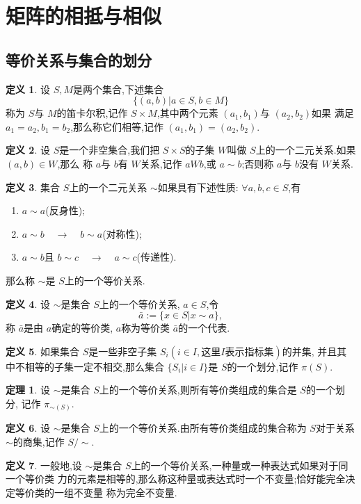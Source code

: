 \documentclass[a4paper,11pt]{article}%
\theoremstyle{remark}
\theoremstyle{definition}
\newtheorem{theorem}{定理}[section]
\theoremstyle{definition}
\newtheorem*{definition}{定义}
\theoremstyle{plain}
\begin{document}
\section{矩阵的相抵与相似}
\subsection{等价关系与集合的划分}
\begin{definition}
    设 $S,M$是两个集合,下述集合
    \[\{(a,b)\vert a\in S,b\in M\}\]
    称为 $S$与 $M$的笛卡尔积,记作 $S\times M$,其中两个元素 $(a_1,b_1)$与 $(a_2,b_2)$如果
    满足 $a_1=a_2,b_1=b_2$,那么称它们相等,记作 $(a_1,b_1)=(a_2,b_2)$.
\end{definition}
\begin{definition}
    设 $S$是一个非空集合,我们把 $S\times S$的子集 $W$叫做 $S$上的一个二元关系.如果 $(a,b)\in W$,那么
    称 $a$与 $b$有 $W$关系,记作 $aWb$,或 $a\sim b$;否则称 $a$与 $b$没有 $W$关系.
\end{definition}
\begin{definition}
    集合 $S$上的一个二元关系 $\sim$如果具有下述性质: $\forall a,b,c\in S$,有
    \begin{enumerate}
        \item $a\sim a$(反身性);
        \item $a\sim b \phantom{aa}\rightarrow \phantom{aa}b\sim a$(对称性);
        \item $a \sim b$且 $b\sim c\phantom{aa}\rightarrow\phantom{aa}a\sim c$(传递性).
    \end{enumerate}
    那么称 $\sim$是 $S$上的一个等价关系.
\end{definition}
\begin{definition}
    设 $\sim$是集合 $S$上的一个等价关系, $a\in S$,令
    \[\bar{a}:=\{x\in S \vert x\sim a\},\]
    称 $\bar{a}$是由 $a$确定的等价类, $a$称为等价类 $\bar{a}$的一个代表.
\end{definition}
\begin{definition}
    如果集合 $S$是一些非空子集 $S_i(i\in I,\text{这里}I\text{表示指标集})$的并集,
    并且其中不相等的子集一定不相交,那么集合 $\{S_i\vert i\in I\}$是 $S$的一个划分,记作 $\pi(S)$.
\end{definition}
\begin{theorem}
    设 $\sim$是集合 $S$上的一个等价关系,则所有等价类组成的集合是 $S$的一个划分,
    记作 $\pi_{\sim(S)}$.
\end{theorem}
\begin{definition}
    设 $\sim$是集合 $S$上的一个等价关系.由所有等价类组成的集合称为 $S$对于关系 
    $\sim$的商集,记作 $S/\sim$.
\end{definition}
\begin{definition}
    一般地,设 $\sim$是集合 $S$上的一个等价关系,一种量或一种表达式如果对于同一个等价类
    力的元素是相等的,那么称这种量或表达式时一个不变量;恰好能完全决定等价类的一组不变量
    称为完全不变量.
\end{definition}
\end{document}
